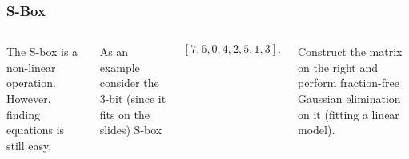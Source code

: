 \documentclass[9pt]{beamer}
\begin{document}
\begin{frame}
\frametitle{S-Box}
\begin{columns}


The S-box is a non-linear operation. However, finding equations is still easy.

\vspace{1em}

As an example consider the 3-bit (since it fits on the slides) S-box 

$$[7,6,0,4,2,5,1,3].$$

\vspace{1em}

Construct the matrix on the right and perform fraction-free Gaussian elimination on it (fitting a linear model).


\end{columns}
\end{frame}
\end{document}
